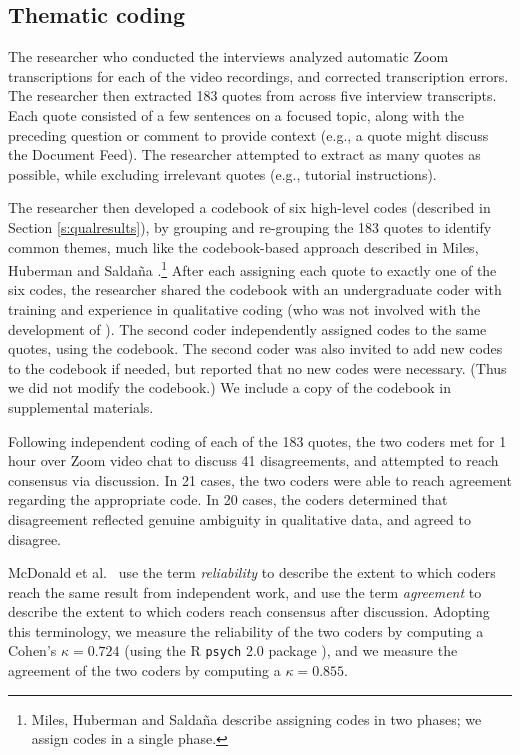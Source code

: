 \subsection{Thematic coding}\label{s:data_analysis}
The researcher who conducted the interviews analyzed automatic Zoom transcriptions for each of the video recordings, and corrected transcription errors. The researcher then extracted 183 quotes from across five interview transcripts.
Each quote consisted of a few sentences on a focused topic, along with the preceding question or comment to provide context (e.g., a quote might discuss the Document Feed). 
The researcher attempted to extract as many quotes as possible, while excluding irrelevant quotes (e.g., tutorial instructions).

The researcher then developed a codebook of six high-level codes (described in Section \ref{s:qualresults}), by grouping and re-grouping the 183 quotes to identify common themes, much like the codebook-based approach described in Miles, Huberman and Salda\~na \cite[Chp. 4]{miles_qualitative_2014}.\footnote{Miles, Huberman and Salda\~na \cite[Chp. 4]{miles_qualitative_2014} describe assigning codes in two phases; we assign codes in a single phase.}
After each assigning each quote to exactly one of the six codes, the researcher shared the codebook with an undergraduate coder with training and experience in qualitative coding (who was not involved with the development of \ours).
The second coder independently assigned codes to the same quotes, using the codebook. 
The second coder was also invited to add new codes to the codebook if needed, but reported that no new codes were necessary. 
(Thus we did not modify the codebook.)
We include a copy of the codebook in supplemental materials.

Following independent coding of each of the 183 quotes, the two coders met for 1 hour over Zoom video chat to discuss 41 disagreements, and attempted to reach consensus via discussion. In 21 cases, the two coders were able to reach agreement regarding the appropriate code. In 20 cases, the coders determined that disagreement reflected genuine ambiguity in qualitative data, and agreed to disagree.

McDonald et al.\ \cite[Section 2.2]{McDonaldCoding} use the term \emph{reliability} to describe the extent to which coders reach the same result from independent work, and use the term \emph{agreement} to describe the extent to which coders reach consensus after discussion.
Adopting this terminology, we measure the reliability of the two coders by computing a Cohen's $\kappa=0.724$ (using the R \texttt{psych} 2.0 package \cite{psych}), and we measure the agreement of the two coders by computing a $\kappa=0.855$.
